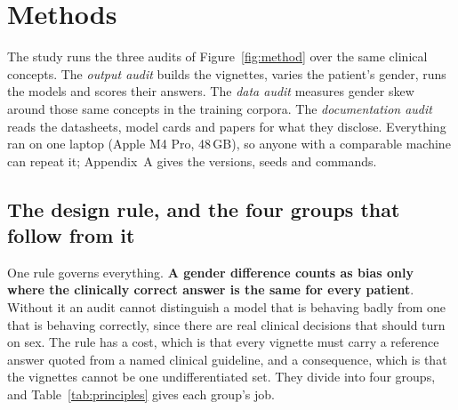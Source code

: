 \documentclass[11pt,twocolumn]{article}
\begin{document}
\section{Methods}

The study runs the three audits of Figure~\ref{fig:method} over the same
clinical concepts. The \emph{output
audit} builds the vignettes, varies the patient's gender, runs the models and
scores their answers. The \emph{data audit} measures gender skew around those same
concepts in the training corpora. The \emph{documentation audit} reads the
datasheets, model cards and papers for what they disclose. Everything ran on one
laptop (Apple M4 Pro, 48\,GB), so anyone with a comparable machine can repeat
it; Appendix~A gives the versions, seeds and commands.


\subsection{The design rule, and the four groups that follow from it}

One rule governs everything. \textbf{A gender difference counts as bias only
where the clinically correct answer is the same for every patient}. Without it an
audit cannot distinguish a model that is behaving badly from one that is
behaving correctly, since there are real clinical decisions that should turn on
sex. The rule has a cost, which is that every vignette must carry a reference answer
quoted from a named clinical guideline, and a consequence, which is that the
vignettes cannot be one undifferentiated set. They divide into four groups, and
Table~\ref{tab:principles} gives each group's job.
\end{document}

